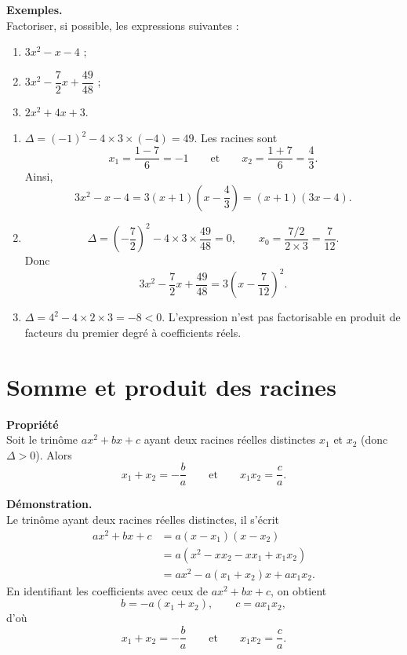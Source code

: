 \documentclass[11pt]{article}
\newenvironment{demonstration}{\par\smallskip\noindent\textbf{Démonstration. \\}\ignorespaces}{\par\smallskip}
\newenvironment{exemples}{\par\smallskip\noindent\textbf{Exemples. \\}\ignorespaces}{\par\smallskip}
\begin{document}
\begin{exemples}
Factoriser, si possible, les expressions suivantes :
\begin{enumerate}[label=\arabic*.]
    \item $3x^2-x-4$ ;
    \item $3x^2-\dfrac{7}{2}x+\dfrac{49}{48}$ ;
    \item $2x^2+4x+3$.
\end{enumerate}

\begin{enumerate}[label=\arabic*.]
    \item $\Delta=(-1)^2-4\times3\times(-4)=49$. Les racines sont
    \[
    x_1=\frac{1-7}{6}=-1
    \qquad\text{et}\qquad
    x_2=\frac{1+7}{6}=\frac{4}{3}.
    \]
    Ainsi,
    \[
    3x^2-x-4=3(x+1)\left(x-\frac{4}{3}\right)=(x+1)(3x-4).
    \]

    \item
    \[
    \Delta=\left(-\frac{7}{2}\right)^2
    -4\times3\times\frac{49}{48}=0,
    \qquad
    x_0=\frac{7/2}{2\times3}=\frac{7}{12}.
    \]
    Donc
    \[
    3x^2-\frac{7}{2}x+\frac{49}{48}
    =3\left(x-\frac{7}{12}\right)^2.
    \]

    \item $\Delta=4^2-4\times2\times3=-8<0$. L'expression n'est pas factorisable en produit de facteurs du premier degré à coefficients réels.
\end{enumerate}
\end{exemples}

\section{Somme et produit des racines}

\begin{propriete}
\textbf{Propriété}\\
Soit le trinôme $ax^2+bx+c$ ayant deux racines réelles distinctes $x_1$ et $x_2$ (donc $\Delta>0$). Alors
\[
x_1+x_2=-\frac{b}{a}
\qquad\text{et}\qquad
x_1x_2=\frac{c}{a}.
\]
\end{propriete}

\begin{demonstration}
Le trinôme ayant deux racines réelles distinctes, il s'écrit
\begin{align*}
ax^2+bx+c
&=a(x-x_1)(x-x_2)\\
&=a(x^2-xx_2-xx_1+x_1x_2)\\
&=ax^2-a(x_1+x_2)x+ax_1x_2.
\end{align*}
En identifiant les coefficients avec ceux de $ax^2+bx+c$, on obtient
\[
b=-a(x_1+x_2),\qquad c=ax_1x_2,
\]
d'où
\[
x_1+x_2=-\frac{b}{a}
\qquad\text{et}\qquad
x_1x_2=\frac{c}{a}.
\]
\end{demonstration}
\end{document}
